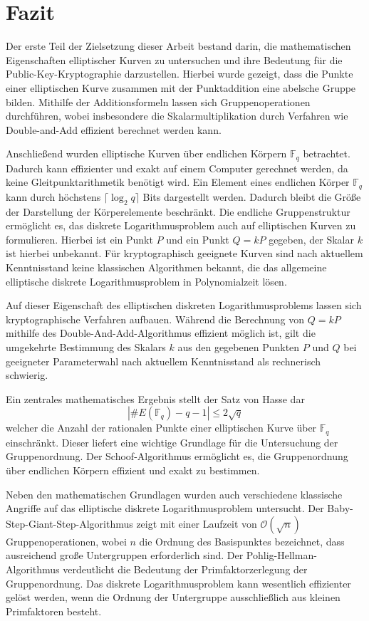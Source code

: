 \chapter{Fazit}
Der erste Teil der Zielsetzung dieser Arbeit bestand darin, die mathematischen Eigenschaften elliptischer Kurven zu untersuchen und ihre Bedeutung für die Public-Key-Kryptographie darzustellen. Hierbei wurde gezeigt, dass die Punkte einer elliptischen Kurve zusammen mit der Punktaddition eine abelsche Gruppe bilden. Mithilfe der Additionsformeln lassen sich Gruppenoperationen durchführen, wobei insbesondere die Skalarmultiplikation durch Verfahren wie Double-and-Add effizient berechnet werden kann.

Anschließend wurden elliptische Kurven über endlichen Körpern $\mathbb{F}_q$ betrachtet. Dadurch kann effizienter und exakt auf einem Computer gerechnet werden, da keine Gleitpunktarithmetik benötigt wird. Ein Element eines endlichen Körper $\mathbb{F}_q$ kann durch höchstens \(\lceil \log_2 q\rceil\) Bits dargestellt werden. Dadurch bleibt die Größe der Darstellung der Körperelemente beschränkt. Die endliche Gruppenstruktur ermöglicht es, das diskrete Logarithmusproblem auch auf elliptischen Kurven zu formulieren. Hierbei ist ein Punkt $P$ und ein Punkt $Q=kP$ gegeben, der Skalar $k$ ist hierbei unbekannt. Für kryptographisch geeignete Kurven sind nach aktuellem Kenntnisstand keine klassischen Algorithmen bekannt, die das allgemeine elliptische diskrete Logarithmusproblem in Polynomialzeit lösen.

Auf dieser Eigenschaft des elliptischen diskreten Logarithmusproblems lassen sich kryptographische Verfahren aufbauen. Während die Berechnung von $Q=kP$ mithilfe des Double-And-Add-Algorithmus effizient möglich ist, gilt die umgekehrte Bestimmung des Skalars \(k\) aus den gegebenen Punkten \(P\) und \(Q\) bei geeigneter Parameterwahl nach aktuellem Kenntnisstand als rechnerisch schwierig.

Ein zentrales mathematisches Ergebnis stellt der Satz von Hasse dar
\[
|\#E(\mathbb{F}_q)-q-1 |\leq 2\sqrt q
\]
welcher die Anzahl der rationalen Punkte einer elliptischen Kurve über \(\mathbb F_q\) einschränkt. Dieser liefert eine wichtige Grundlage für die Untersuchung der Gruppenordnung. Der Schoof-Algorithmus ermöglicht es, die Gruppenordnung über endlichen Körpern effizient und exakt zu bestimmen.

Neben den mathematischen Grundlagen wurden auch verschiedene klassische Angriffe auf das elliptische diskrete Logarithmusproblem untersucht. Der Baby-Step-Giant-Step-Algorithmus zeigt mit einer Laufzeit von \(\mathcal O(\sqrt n)\) Gruppenoperationen, wobei \(n\) die Ordnung des Basispunktes bezeichnet, dass ausreichend große Untergruppen erforderlich sind. Der Pohlig-Hellman-Algorithmus verdeutlicht die Bedeutung der Primfaktorzerlegung der Gruppenordnung. Das diskrete Logarithmusproblem kann wesentlich effizienter gelöst werden, wenn die Ordnung der Untergruppe ausschließlich aus kleinen Primfaktoren besteht.

